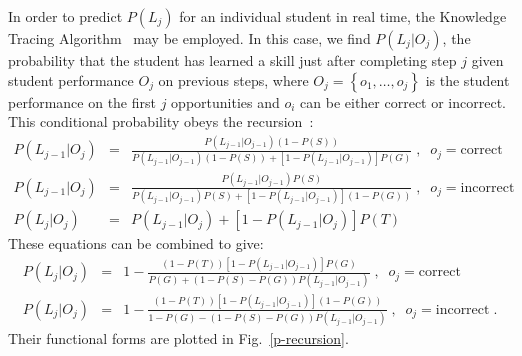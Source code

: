 \documentclass{acmlarge-edm}
\begin{document}
In order to predict $P(L_j)$ for an individual student in real time,
the Knowledge Tracing Algorithm~\cite{corbett_knowledge_1995} may be employed.
In this case, we find $P(L_j|O_j)$,  the probability that the student has 
learned a skill just after completing step $j$ given student
performance $O_j$ on previous steps, where $O_j=\left\{o_1,\ldots,o_j\right\}$ is the student performance
on the first $j$ opportunities and $o_i$ can be either correct or
incorrect.  This conditional probability obeys the
recursion~\cite{baker_more_2008}: 
%
\begin{eqnarray}
       P(L_{j-1}|O_j) &=&
       \frac{P(L_{j-1}|O_{j-1})\left(1-P(S)\right)}{P(L_{j-1}|O_{j-1})\left(1-P(S)\right)+
                                       \left[1-P(L_{j-1}|O_{j-1})\right]P(G)}
                                     \; , \;\; o_j=\mbox{correct}\\
        P(L_{j-1}|O_j) &=& 
              \frac{P(L_{j-1}|O_{j-1}) P(S)}
              {P(L_{j-1}|O_{j-1}) P(S)+ \left[1-P(L_{j-1}|O_{j-1})\right]\left(1-P(G)\right)}
                        \; , \;\; o_j=\mbox{incorrect}\\
       P(L_j|O_j) &=& P\left(L_{j-1}|O_j\right)+
               \left[1-P(L_{j-1}|O_j)\right] P(T)
\end{eqnarray}
%
These equations can be combined to give:
%
\begin{eqnarray}
       P(L_j|O_j) &=&
       1-\frac{\left(1-P(T)\right)\left[1-P(L_{j-1}|O_{j-1})\right]P(G)}{P(G)+\left(1-P(S)-P(G)\right)
        P(L_{j-1}|O_{j-1})}  \;,\;\; o_j=\mbox{correct} \label{correct}\\
      P(L_j|O_j) &=& 1-\frac{\left(1-P(T)\right)\left[1-P(L_{j-1}|O_{j-1})\right]\left(1-P(G)\right)}
                                 {1-P(G)-\left(1-P(S)-P(G)\right) P(L_{j-1}|O_{j-1})}
                        \; ,\;\; o_j=\mbox{incorrect} \; . \label{incorrect}
\end{eqnarray}
%
Their functional forms are plotted in Fig.~\ref{p-recursion}.  
\end{document}
